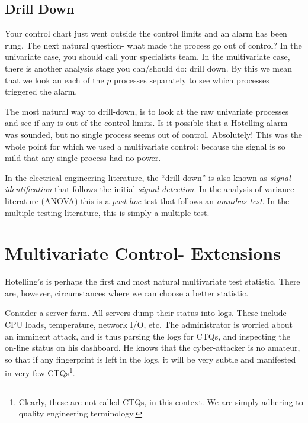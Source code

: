 \subsection{Drill Down}
Your control chart just went outside the control limits and an alarm has been rung.
The next natural question- what made the process go out of control?
In the univariate case, you should call your specialists team. 
In the multivariate case, there is another analysis stage you can/should do: drill down.
By this we mean that we look an each of the $p$ processes separately to see which processes triggered the alarm.

The most natural way to drill-down, is to look at the raw univariate processes and see if any is out of the control limits.
Is it possible that a Hotelling alarm was sounded, but no single process seems out of control.
Absolutely! 
This was the whole point for which we used a multivariate control: because the signal is so mild that any single process had no power.

\begin{extra}
In the electrical engineering literature, the ``drill down'' is also known as \emph{signal identification} that follows the initial \emph{signal detection}. 
In the analysis of variance literature (ANOVA) this is a \emph{post-hoc} test that follows an \emph{omnibus test}.
In the multiple testing literature, this is simply a multiple test. 
\end{extra}





\section[Multivariate extensions]{Multivariate Control- Extensions}

Hotelling's \tsq is perhaps the first and most natural multivariate test statistic.
There are, however, circumstances where we can choose a better statistic.


\begin{example}
\label{eg:cyber}
Consider a server farm. 
All servers dump their status into logs. These include CPU loads, temperature, network I/O, etc.
The administrator is worried about an imminent attack, and is thus parsing the logs for CTQs, and inspecting the on-line status on his dashboard.
He knows that the cyber-attacker is no amateur, so that if any fingerprint is left in the logs, it will be very subtle and manifested in very few CTQs\footnote{Clearly, these are not called CTQs, in this context. We are simply adhering to quality engineering terminology.}.
\end{example}


